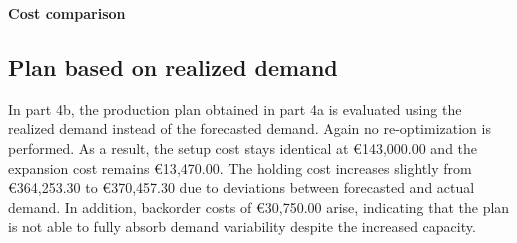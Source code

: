 \documentclass[a4paper,faculty=eb,language=en,doctype=article,sftitles=false]{ugent-doc}
\begin{document}
\begin{table}[H]
\centering
\begin{minipage}[c]{0.50\textwidth}
\centering
{}
\end{minipage}
\hspace{0.03\textwidth}
\begin{minipage}[c]{0.42\textwidth}
\centering
\textbf{Cost comparison}

\vspace{0.3em}
\end{minipage}
\caption{Cost comparison part 2a, 3a and 4a}
\end{table}

\subsection{Plan based on realized demand}

In part 4b, the production plan obtained in part 4a is evaluated using the realized demand instead of the forecasted demand. Again no re-optimization is performed. As a result, the setup cost stays identical at €143{,}000.00 and the expansion cost remains €13{,}470.00. The holding cost increases slightly from €364{,}253.30 to €370{,}457.30 due to deviations between forecasted and actual demand. In addition, backorder costs of €30{,}750.00 arise, indicating that the plan is not able to fully absorb demand variability despite the increased capacity.
\end{document}
